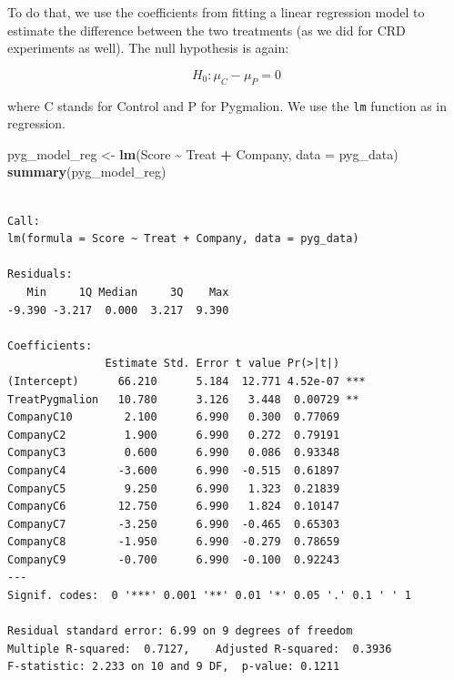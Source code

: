 \documentclass[
  letterpaper,
]{book}
\newenvironment{Shaded}{\begin{snugshade}}{\end{snugshade}}
\newcommand{\AttributeTok}[1]{\textcolor[rgb]{0.13,0.29,0.53}{#1}}
\newcommand{\FunctionTok}[1]{\textcolor[rgb]{0.13,0.29,0.53}{\textbf{#1}}}
\newcommand{\NormalTok}[1]{#1}
\newcommand{\OtherTok}[1]{\textcolor[rgb]{0.56,0.35,0.01}{#1}}
\newcommand{\SpecialCharTok}[1]{\textcolor[rgb]{0.81,0.36,0.00}{\textbf{#1}}}
\begin{document}
To do that, we use the coefficients from fitting a linear regression
model to estimate the difference between the two treatments (as we did
for CRD experiments as well). The null hypothesis is again:

\[H_0: \mu_C - \mu_P = 0 \]

where C stands for Control and P for Pygmalion. We use the \texttt{lm}
function as in regression.


\begin{Shaded}
\begin{Highlighting}[]
\NormalTok{pyg\_model\_reg }\OtherTok{\textless{}{-}} \FunctionTok{lm}\NormalTok{(Score }\SpecialCharTok{\textasciitilde{}}\NormalTok{ Treat }\SpecialCharTok{+}\NormalTok{ Company, }\AttributeTok{data =}\NormalTok{ pyg\_data)}
\FunctionTok{summary}\NormalTok{(pyg\_model\_reg)}
\end{Highlighting}
\end{Shaded}

\begin{verbatim}

Call:
lm(formula = Score ~ Treat + Company, data = pyg_data)

Residuals:
   Min     1Q Median     3Q    Max 
-9.390 -3.217  0.000  3.217  9.390 

Coefficients:
               Estimate Std. Error t value Pr(>|t|)    
(Intercept)      66.210      5.184  12.771 4.52e-07 ***
TreatPygmalion   10.780      3.126   3.448  0.00729 ** 
CompanyC10        2.100      6.990   0.300  0.77069    
CompanyC2         1.900      6.990   0.272  0.79191    
CompanyC3         0.600      6.990   0.086  0.93348    
CompanyC4        -3.600      6.990  -0.515  0.61897    
CompanyC5         9.250      6.990   1.323  0.21839    
CompanyC6        12.750      6.990   1.824  0.10147    
CompanyC7        -3.250      6.990  -0.465  0.65303    
CompanyC8        -1.950      6.990  -0.279  0.78659    
CompanyC9        -0.700      6.990  -0.100  0.92243    
---
Signif. codes:  0 '***' 0.001 '**' 0.01 '*' 0.05 '.' 0.1 ' ' 1

Residual standard error: 6.99 on 9 degrees of freedom
Multiple R-squared:  0.7127,    Adjusted R-squared:  0.3936 
F-statistic: 2.233 on 10 and 9 DF,  p-value: 0.1211
\end{verbatim}
\end{document}
